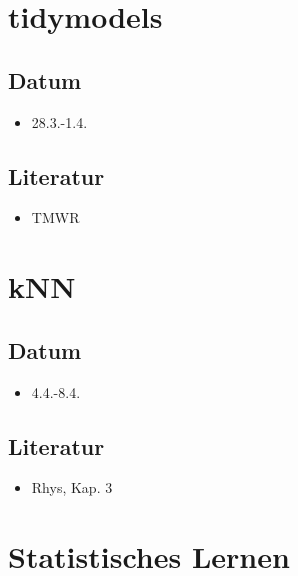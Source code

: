 \documentclass[
]{book}
\providecommand{\tightlist}{%
  \setlength{\itemsep}{0pt}\setlength{\parskip}{0pt}}
\begin{document}
\hypertarget{tidymodels}{%
\section{tidymodels}\label{tidymodels}}

\hypertarget{datum-2}{%
\subsection{Datum}\label{datum-2}}

\begin{itemize}
\tightlist
\item
  28.3.-1.4.
\end{itemize}

\hypertarget{literatur-3}{%
\subsection{Literatur}\label{literatur-3}}

\begin{itemize}
\tightlist
\item
  TMWR
\end{itemize}

\hypertarget{knn}{%
\section{kNN}\label{knn}}

\hypertarget{datum-3}{%
\subsection{Datum}\label{datum-3}}

\begin{itemize}
\tightlist
\item
  4.4.-8.4.
\end{itemize}

\hypertarget{literatur-4}{%
\subsection{Literatur}\label{literatur-4}}

\begin{itemize}
\tightlist
\item
  Rhys, Kap. 3
\end{itemize}

\hypertarget{statistisches-lernen}{%
\section{Statistisches Lernen}\label{statistisches-lernen}}
\end{document}

